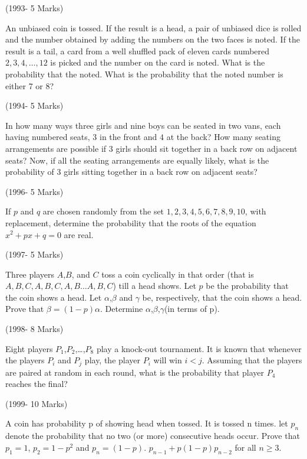 \hfill(1993- 5 Marks)

\item An unbiased coin is tossed. If the result is a head, a pair of unbiased dice is rolled and the number obtained by adding the numbers on the two faces is noted. If the result is a tail, a card from a well shuffled pack of eleven cards numbered $ 2, 3, 4, \dots , 12 $ is picked and the number on the card is noted. What is the probability that the noted. What is the probability that the noted number is either 7 or 8?

\hfill(1994- 5 Marks)

\item In how many ways three girls and nine boys can be seated in two vans, each having numbered seats, $3$ in the front and $4$ at the back? How many seating arrangements are possible if 3 girls should sit together in a back row on adjacent seats? Now, if all the seating arrangements are equally likely, what is the probability of 3 girls sitting together in a back row on adjacent seats?

\hfill(1996- 5 Marks)

\item If $p$ and $q$ are chosen randomly from the set ${1,2,3,4,5,6,7,8,9,10}$, with replacement, determine the probability that the roots of the equation $x^2+px+q=0$ are real.
                                                      
\hfill(1997- 5 Marks)

\item Three players $A$,$B$, and $C$ toss a coin cyclically in that order (that is$ A,B,C,A,B,C,A,B \dots A,B,C $) till a head shows. Let $p$ be the probability that the coin shows a head. Let $\alpha$,$\beta$ and $\gamma$ be, respectively, that the coin shows a head. Prove that $\beta=(1-p)\alpha$. Determine $\alpha$,$\beta$,$\gamma$(in terms of p).

\hfill(1998- 8 Marks)

\item Eight players $P_{1}$,$P_{2}$,\dots ,$P_{8}$ play a knock-out tournament. It is known that whenever the players $P_{i}$ and $P_{j}$ play, the player $P_{i}$ will win $i<j$. Assuming that the players are paired at random in each round, what is the probability that player $P_{4}$ reaches the final?

\hfill(1999- 10 Marks)

\item A coin has probability p of showing head when tossed. It is tossed n times. let $p_{n}$ denote the probability that no two (or more) consecutive heads occur. Prove that $p_{1}=1$, $p_{2}=1-p^2$ and $p_{n}=(1-p)$. $p_{n-1}+p(1-p)p_{n-2}$ for all $n \geq 3$. 

